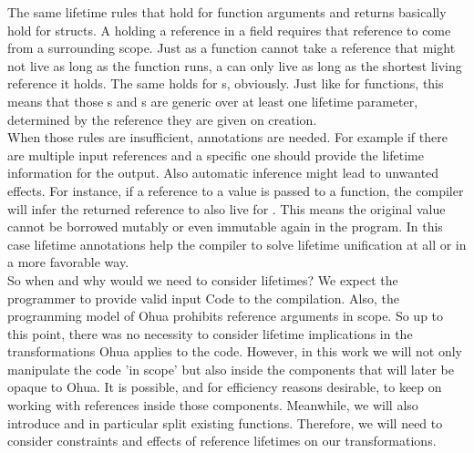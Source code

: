 The same lifetime rules that hold for function arguments and returns basically hold for structs. A  holding a reference in a field requires that reference to come from a surrounding scope. Just as a function cannot take a reference that might not live as long as the function runs, a  can only live as long as the shortest living reference it holds. The same holds for s, obviously. Just like for functions, this means that those s and s are generic over at least one lifetime parameter, determined by the reference they are given on creation.\\

When those rules are insufficient, annotations are needed. For example if there are multiple input references and a specific one should provide the lifetime information for the output. Also automatic inference might lead to unwanted effects. For instance, if a reference to a  value is passed to a function, the compiler will infer the returned reference to also live for . This means the original value cannot be borrowed mutably or even immutable again in the program. In this case lifetime annotations help the compiler to solve lifetime unification at all or in a more favorable way. \\

So when and why would we need to consider lifetimes? We expect the programmer to provide valid input Code to the compilation. Also, the programming model of Ohua prohibits reference arguments in scope. So up to this point, there was no necessity to consider lifetime implications in the transformations Ohua applies to the code. However, in this work we will not only manipulate the code 'in scope' but also inside the components that will later be opaque to Ohua. It is possible, and for efficiency reasons desirable, to keep on working with references inside those components. Meanwhile, we will also introduce and in particular split existing functions. Therefore, we will need to consider constraints and effects of reference lifetimes on our transformations.




